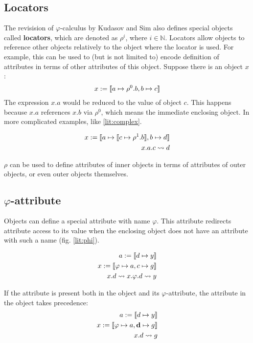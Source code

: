 \subsection{Locators}

The revisision of $\varphi$-calculus by Kudasov and Sim \cite{kudasov} also defines special objects called \textbf{locators}, which are denoted as $\rho^i$, where $i \in \mathbb{N}$. Locators allow objects to reference other objects relatively to the object where the locator is used. For example, this can be used to (but is not limited to) encode definition of attributes in terms of other attributes of this object. Suppose there is an object $x$:
\begin{align*}
    x := \llbracket a \mapsto \rho^0.b, b \mapsto c \rrbracket
\end{align*}
The expression $x.a$ would be reduced to the value of object $c$. This happens because $x.a$ references $x.b$ via $\rho^0$, which means the immediate enclosing object. In more complicated examples, like \ref{lit:complex}.

\begin{align}
    \label{lit:complex}
    x := \llbracket a \mapsto \llbracket c \mapsto \rho^1.b \rrbracket, b \mapsto d \rrbracket \\
    x.a.c \rightsquigarrow d
\end{align}

$\rho$ can be used to define attributes of inner objects in terms of attributes of outer objects, or even outer objects themselves.

\subsection{$\varphi$-attribute}
Objects can define a special attribute with name $\varphi$. This attribute redirects attribute access to its value when the enclosing object does not have an attribute with such a name (fig. \ref{lit:phi}).

\begin{align}
    \label{lit:phi}
    a := \llbracket d \mapsto y \rrbracket                    \\
    \label{lit:decorated}
    x := \llbracket \varphi \mapsto a, c \mapsto g \rrbracket \\
    x.d \rightsquigarrow x.\varphi.d \rightsquigarrow y
\end{align}

If the attribute is present both in the object and its $\varphi$-attribute, the attribute in the object takes precedence:
\begin{align*}
    a := \llbracket d \mapsto y \rrbracket                             \\
    x := \llbracket \varphi \mapsto a, \textbf{d} \mapsto g \rrbracket \\
    x.d \rightsquigarrow g
\end{align*}

